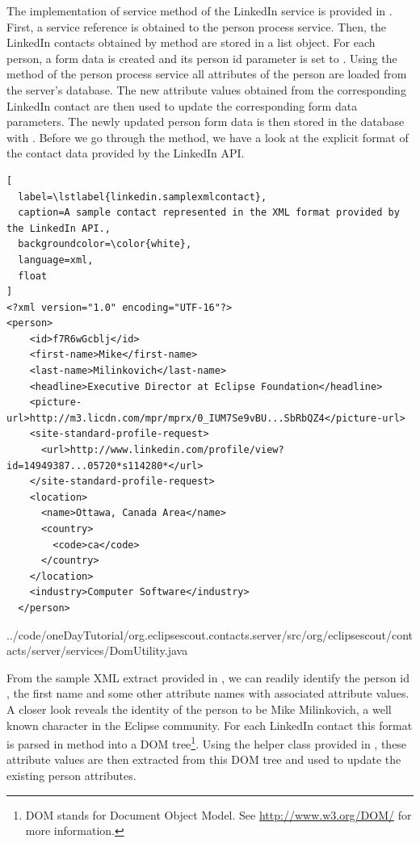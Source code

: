 \documentclass[a4paper,10pt,twoside]{book}
\begin{document}
The implementation of service method  of the LinkedIn service is provided in .
First, a service reference is obtained to the person process service. 
Then, the LinkedIn contacts obtained by method  are stored in a  list object. 
For each person, a form data is created and its person id parameter is set to . 
Using the  method of the person process service all attributes of the person are loaded from the server's database. 
The new attribute values obtained from the corresponding LinkedIn contact are then used to update the corresponding form data parameters. 
The newly updated person form data is then stored in the database with .
Before we go through the  method, we have a look at the explicit format of the contact data provided by the LinkedIn API. 

\begin{lstlisting}[
  label=\lstlabel{linkedin.samplexmlcontact},
  caption=A sample contact represented in the XML format provided by the LinkedIn API.,
  backgroundcolor=\color{white},
  language=xml,
  float
]
<?xml version="1.0" encoding="UTF-16"?>
<person>
    <id>f7R6wGcblj</id>
    <first-name>Mike</first-name>
    <last-name>Milinkovich</last-name>
    <headline>Executive Director at Eclipse Foundation</headline>
    <picture-url>http://m3.licdn.com/mpr/mprx/0_IUM7Se9vBU...SbRbQZ4</picture-url>
    <site-standard-profile-request>
      <url>http://www.linkedin.com/profile/view?id=14949387...05720*s114280*</url>
    </site-standard-profile-request>
    <location>
      <name>Ottawa, Canada Area</name>
      <country>
        <code>ca</code>
      </country>
    </location>
    <industry>Computer Software</industry>
  </person>
\end{lstlisting}


{../code/oneDayTutorial/org.eclipsescout.contacts.server/src/org/eclipsescout/contacts/server/services/DomUtility.java}

From the sample XML extract provided in , we can readily identify the person id , the first name  and some other attribute names with associated attribute values. 
A closer look reveals the identity of the person to be Mike Milinkovich, a well known character in the Eclipse community. 
For each LinkedIn contact this format is parsed in method  into a DOM tree\footnote{
DOM stands for Document Object Model. See \url{http://www.w3.org/DOM/} for more information.
}. 
Using the  helper class provided in , these attribute values are then extracted from this DOM tree and used to update the existing person attributes. 
\end{document}
